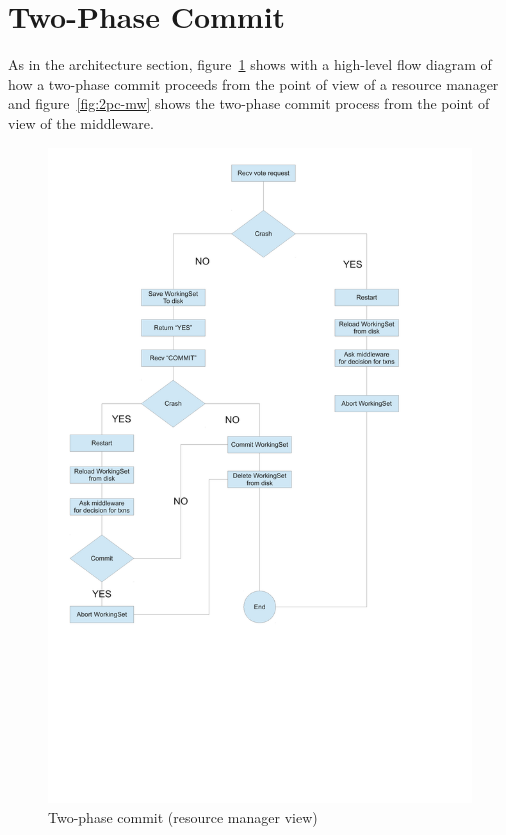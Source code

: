 \documentclass[11pt]{article}
\begin{document}
\section{Two-Phase Commit}

As in the architecture section, figure~\ref{fig:2pc} shows with a
high-level flow diagram of how a two-phase commit proceeds from the
point of view of a resource manager and figure~\ref{fig:2pc-mw} shows
the two-phase commit process from the point of view of the middleware.

\begin{figure}[H]
  \caption{Two-phase commit (resource manager view)}
  \label{fig:2pc}

  \begin{center}
    \includegraphics[scale=0.6]{2pc.pdf}
  \end{center}
\end{figure}
\end{document}
